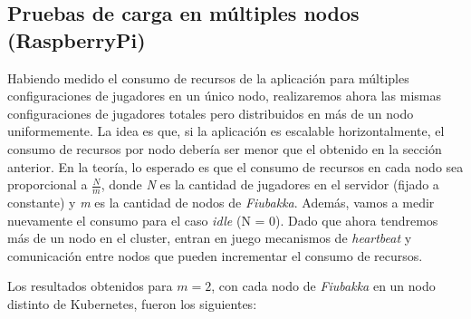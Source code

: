 \subsection{Pruebas de carga en múltiples nodos (RaspberryPi)}

\noindent Habiendo medido el consumo de recursos de la aplicación para múltiples configuraciones de jugadores en un único nodo, realizaremos ahora las mismas configuraciones de jugadores totales
pero distribuidos en más de un nodo uniformemente. La idea es que, si la aplicación es escalable horizontalmente, el consumo de recursos por nodo debería ser menor que el obtenido en la sección anterior.
En la teoría, lo esperado es que el consumo de recursos en cada nodo sea proporcional a $\frac{N}{m}$, donde \textit{N} es la cantidad de jugadores en el servidor (fijado a constante) y \textit{m} es la cantidad de nodos de \textit{Fiubakka}.
Además, vamos a medir nuevamente el consumo para el caso \textit{idle} (N = 0). Dado que ahora tendremos más de un nodo en el cluster, entran en juego mecanismos de \textit{heartbeat} y comunicación
entre nodos que pueden incrementar el consumo de recursos.

Los resultados obtenidos para $m=2$, con cada nodo de \textit{Fiubakka} en un nodo distinto de Kubernetes, fueron los siguientes:

